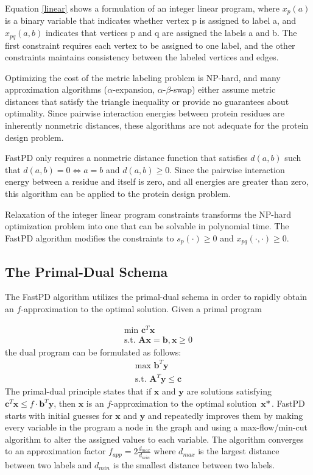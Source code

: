 \documentclass[11pt]{article}
\begin{document}
	Equation \ref{linear} shows a formulation of an integer linear program, where
	$x_p(a)$ is a binary variable that indicates whether vertex p is assigned to
	label a, and $x_{pq}(a,b)$ indicates that vertices p and q are assigned the
	labels a and b.  The first constraint requires each vertex to be assigned to
	one label, and the other constraints maintains consistency between the labeled
	vertices and edges.
	
	Optimizing the cost of the metric labeling problem is NP-hard, and many
	approximation algorithms ($\alpha$-expansion, $\alpha$-$\beta$-swap) either
	assume metric distances that satisfy the triangle inequality or provide no
	guarantees about optimality.  Since pairwise interaction energies between
	protein residues are inherently nonmetric distances, these algorithms are not
	adequate for the protein design problem.  
	
	FastPD only requires a nonmetric distance function that satisfies $d(a,b)$ such
	that $d(a,b)=0 \iff a=b$ and $d(a,b) \geq 0$.  Since the pairwise interaction
	energy between a residue and itself is zero, and all energies are greater than
	zero, this algorithm can be applied to the protein design problem.  
	
	Relaxation of the integer linear program constraints transforms the NP-hard
	optimization problem into one that can be solvable in polynomial time.  The 
	FastPD algorithm modifies the constraints to 
	$s_p(\cdot) \ge 0$ and $x_{pq}(\cdot, \cdot) \ge 0$.  

	\subsection{The Primal-Dual Schema}	
	
	The FastPD algorithm utilizes the primal-dual schema in order to rapidly obtain
	an $f$-approximation to the optimal solution. Given a primal program
	
	\begin{gather*}
	\text{min }\textbf{c}^T\textbf{x} \\
	\text{s.t. }\textbf{Ax} = \textbf{b}, \textbf{x} \geq 0
	\end{gather*}
	the dual program can be formulated as follows:
	\begin{gather*}
	\text{max } \textbf{b}^T\textbf{y} \\
	\text{s.t. }\textbf{A}^T\textbf{y} \leq \textbf{c} 
	\end{gather*}		
	The primal-dual principle states that if $\textbf{x}$ and $\textbf{y}$ are
	solutions satisfying $\textbf{c}^T\textbf{x} \leq f \cdot \textbf{b}^T\textbf{y}$,
	then $\textbf{x}$ is an $f$-approximation to the optimal solution $\textbf{x}*$.
	FastPD starts with initial guesses for $\textbf{x}$ and $\textbf{y}$ and 
	repeatedly improves them by making every variable in the program a node in the
	graph and using a max-flow/min-cut algorithm to alter the assigned values to
	each variable. The algorithm converges to an approximation factor
	$f_{app} = 2 \frac{d_{max}}{d_{min}}$ where $d_{max}$ is the largest distance
	between two labels and $d_{min}$ is the smallest distance between two labels. 
\end{document}
